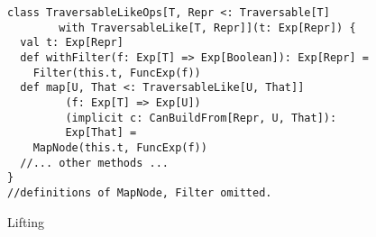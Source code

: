 \begin{figure}
\begin{center}
\begin{lstlisting}
class TraversableLikeOps[T, Repr <: Traversable[T]
        with TraversableLike[T, Repr]](t: Exp[Repr]) {
  val t: Exp[Repr]
  def withFilter(f: Exp[T] => Exp[Boolean]): Exp[Repr] =
    Filter(this.t, FuncExp(f))
  def map[U, That <: TraversableLike[U, That]]
         (f: Exp[T] => Exp[U])
         (implicit c: CanBuildFrom[Repr, U, That]):
         Exp[That] =
    MapNode(this.t, FuncExp(f))
  //... other methods ...
}
//definitions of MapNode, Filter omitted.
\end{lstlisting}
\end{center}
\caption{Lifting }
\label{fig:liftTrav}
\end{figure}


